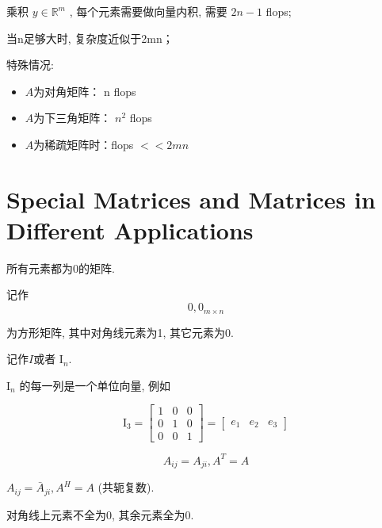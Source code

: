 乘积 $ y \in \mathbb{R}^{m} $ , 每个元素需要做向量内积, 需要 $ 2 n-1 $ flops;

当n足够大时, 复杂度近似于2mn；

特殊情况:

\begin{itemize}
    \item $A$为对角矩阵： $ \mathrm{n} $ flops
    \item $A$为下三角矩阵： $ n^{2} $ flops
    \item $A$为稀疏矩阵时：flops $ <<2 m n $
\end{itemize}


\section{Special Matrices and Matrices in Different Applications}

\begin{definition}
    所有元素都为0的矩阵.

    记作$$0, 0_{m \times n} $$
\end{definition}

\begin{definition}[单位矩阵]
    为方形矩阵, 其中对角线元素为1, 其它元素为0.

    记作$I$或者 $ \mathrm{I}_{n} $.
\end{definition}

\begin{corollary}
  $ \mathrm{I}_{n} $ 的每一列是一个单位向量, 例如

$$
\mathrm{I}_{3}=\left[\begin{array}{lll}
1 & 0 & 0 \\
0 & 1 & 0 \\
0 & 0 & 1
\end{array}\right]=\left[\begin{array}{lll}
e_{1} & e_{2} & e_{3}
\end{array}\right]
$$
\end{corollary}

\begin{definition}
    $$ A_{i j}=A_{j i}, A^T =A $$
\end{definition}

\begin{definition}
    $ A_{i j}=\bar{A}_{j i}, A^H = A $ (共轭复数).
\end{definition}

\begin{definition}
    对角线上元素不全为0, 其余元素全为0.
\end{definition}

